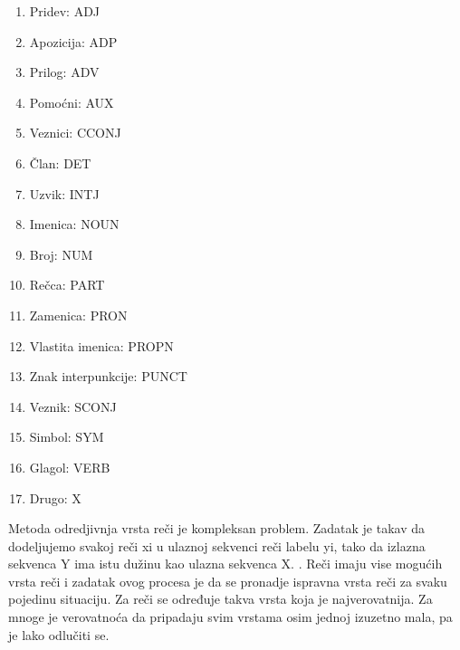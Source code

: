 \documentclass[12pt,oneside]{memoir}
\begin{document}
\begin{enumerate}
\item Pridev: ADJ
\item Apozicija: ADP
\item Prilog: ADV
\item Pomoćni: AUX
\item Veznici: CCONJ
\item Član: DET
\item Uzvik: INTJ
\item Imenica: NOUN
\item Broj: NUM
\item Rečca: PART
\item Zamenica: PRON
\item Vlastita imenica: PROPN
\item Znak interpunkcije: PUNCT
\item Veznik: SCONJ
\item Simbol: SYM
\item Glagol: VERB
\item Drugo: X
\end{enumerate}

Metoda odredjivnja vrsta reči je kompleksan problem.  Zadatak je takav da dodeljujemo svakoj reči xi u ulaznoj sekvenci reči labelu yi,  tako da izlazna sekvenca Y ima istu dužinu kao ulazna sekvenca X.  \cite{pos_tagging}. Reči imaju vise mogućih vrsta reči i zadatak ovog procesa je da se pronadje ispravna vrsta reči za svaku pojedinu situaciju.  Za reči se određuje takva vrsta koja je najverovatnija.  Za mnoge je verovatnoća da pripadaju svim vrstama osim jednoj izuzetno mala,  pa je lako odlučiti se.  
\end{document}
